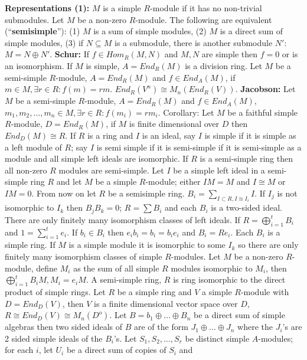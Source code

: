 {\bf Representations (1):}
$M$ is a simple $R$-module if it has no non-trivial submodules.  Let $M$ be a non-zero
$R$-module.  The following are equivalent (``{\bf semisimple}''): (1) $M$ is a sum of simple
modules, (2) $M$ is a direct sum of simple modules, (3) if $N \subseteq M$ is a
submodule, there is another submodule $N'$: $M= N \oplus N'$.  
{\bf Schur:} If $f \in Hom_R(M,N)$ and $M, N$ are simple then $f=0$ or is an isomorphism.
If $M$ is simple, $A=End_R(M)$ is a division ring.
Let $M$ be a semi-simple $R$-module, $A=End_R(M)$ and $f \in End_A(M)$, 
if $m \in M, \exists r \in R: f(m)= rm$.  $End_R(V^n) \cong M_n(End_R(V))$.
{\bf Jacobson:}
Let $M$ be a semi-simple $R$-module, $A=End_R(M)$ and $f \in End_A(M)$, 
$m_1 , m_2 , \ldots , m_n \in M, \exists r \in R: f(m_i)=rm_i$.  Corollary:
Let $M$ be a faithful simple $R$-module, $D=End_R(M)$, if $M$ is finite dimensional
over $D$ then $End_D(M) \cong R$.  
If $R$ is a ring and $I$ is an ideal, say $I$ is simple if it is 
simple as a left module of $R$; say $I$ is semi simple if it is semi-simple if
it is semi-simple as a module and all simple left ideals are isomorphic.
If $R$ is a semi-simple ring then all non-zero $R$ modules are semi-simple.
Let $I$ be a simple left ideal in a semi-simple ring $R$ and let $M$
be a simple $R$-module; either $IM=M$ and $I \cong M$ or $IM=0$.
From now on
let $R$ be a semisimple ring.  $B_i= \sum_{I \subset R, I \cong I_i} I$.
If $I_j$ is not isomorphic to $I_k$ then $B_j B_k = 0$; $R= \sum B_i$ and
each $B_i$ is a two-sided ideal.  There are only finitely many isomorphism classes
of left ideals.  If $R= \bigoplus_{i=1}^t B_i$ and $1= \sum_{i=1}^t e_i$.
If $b_i \in B_i$ then $e_i b_i = b_i = b_i e_i$ and $B_i=Re_i$.  Each $B_i$ is
a simple ring.  If $M$ is a simple module it is isomorphic to some $I_k$ so there
are only finitely many isomorphism classes of simple $R$-modules.  Let $M$
be a non-zero $R$-module, define $M_i$ as the sum of all simple $R$ modules
isomorphic to $M_i$, then $\bigoplus_{i=1}^t B_i M, M_i= e_iM$.  A semi-simple ring,
$R$ is ring isomorphic to the direct product of simple rings.  Let $R$ be a simple
ring and $V$ a simple $R$-module with $D=End_D(V)$, then $V$ is a finite
dimensional vector space over $D$, $R \cong End_D(V) \cong M_n(D^o)$.
Let $B= b_1 \oplus \ldots \oplus B_n$ be a direct sum of simple algebras then
two sided ideals of $B$ are of the form $J_1 \oplus \ldots \oplus J_n$ where
the $J_i$'s are 2 sided simple ideals of the $B_i$'s.
Let $S_1 , S_2 , \ldots , S_r$ be distinct simple $A$-modules; for each
$i$, let $U_i$ be a direct sum of copies of $S_i$ and
